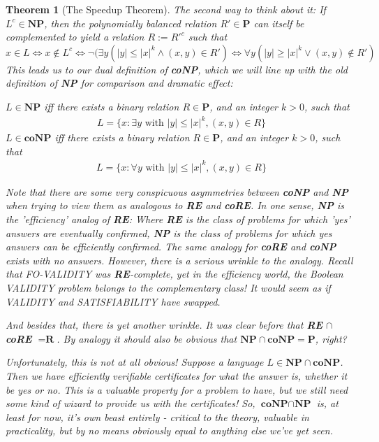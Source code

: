 \documentclass{article}
\theoremstyle{definition}
\theoremstyle{plain}
\theoremstyle{theorem}
\newtheorem{theorem}{Theorem}[section]
\begin{document}
\begin{theorem}[The Speedup Theorem]
\par The second way to think about it: If $L^c \in \textbf{NP}$, then the polynomially balanced relation $R' \in \textbf{P}$ can itself be complemented to yield a relation $R := R'^c$ such that
\[x \in L \iff x \notin L^c \iff \neg(\exists y(|y| \leq |x|^k \wedge (x,y) \in R')
    \iff \forall y(|y| \geq |x|^k \vee (x,y) \notin R')\]
This leads us to our dual definition of \textbf{coNP}, which we will line up with the old definition of \textbf{NP} for comparison and dramatic effect:
\begin{center}
    $L \in \textbf{NP}$ iff there exists a binary relation $R \in \textbf{P}$, and an integer $k>0$, such that
    \begin{align}
        L = \{x: \exists y \textrm{ with } |y| \leq |x|^k, (x,y) \in R \}
    \end{align}
    $L \in \textbf{coNP}$ iff there exists a binary relation $R \in \textbf{P}$, and an integer $k>0$, such that
    \begin{align}
        L = \{x: \forall y \textrm{ with } |y| \leq |x|^k, (x,y) \in R \} 
    \end{align}
\end{center}
Note that there are some very conspicuous asymmetries between \textbf{coNP} and \textbf{NP} when trying to view them as analogous to \textbf{RE} and \textbf{coRE}. In one sense, \textbf{NP} is the 'efficiency' analog of \textbf{RE}: Where \textbf{RE} is the class of problems for which 'yes' answers are \textit{eventually} confirmed, \textbf{NP} is the class of problems for which yes answers \textit{can be efficiently confirmed}. The same analogy for \textbf{coRE} and \textbf{coNP} exists with no answers. However, there is a serious wrinkle to the analogy. Recall that FO-VALIDITY was \textbf{RE}-complete, yet in the efficiency world, the Boolean VALIDITY problem belongs to the complementary class! It would seem as if VALIDITY and SATISFIABILITY have \textit{swapped}. 
\par And besides that, there is yet another wrinkle. It was clear before that \textbf{RE} $\cap$ \textbf{coRE} $ = \textbf{R}$. By analogy it should also be obvious that $\textbf{NP} \cap \textbf{coNP} = \textbf{P}$, right?
\par Unfortunately, this is not at all obvious! Suppose a language $L \in \textbf{NP} \cap \textbf{coNP}$. Then we have efficiently verifiable certificates for what the answer is, whether it be yes or no. This is a valuable property for a problem to have, but we still need some kind of wizard to provide us with the certificates! So, $\textbf{coNP} \cap \textbf{NP}$ is, at least for now, it's own beast entirely - critical to the theory, valuable in practicality, but by no means obviously equal to anything else we've yet seen.

\end{theorem}
\end{document}
